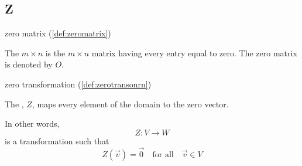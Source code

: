 \documentclass{ximera}
\begin{document}
\subsection*{Z}

zero matrix (\ref{def:zeromatrix})
\begin{expandable}{}{}
    The $m\times n$  is the $m\times n$ matrix
having every entry equal to zero. The zero matrix is
denoted by $O$.
\end{expandable}

zero transformation (\ref{def:zerotransonrn})
\begin{expandable}{}{}
    The , $Z$, maps every element of the domain to the zero vector.

In other words,
$$Z:V\rightarrow W$$ is a transformation such that $$Z(\vec{v})=\vec{0}\quad\text{for all}\quad \vec{v} \in V$$
\end{expandable}
\end{document}
